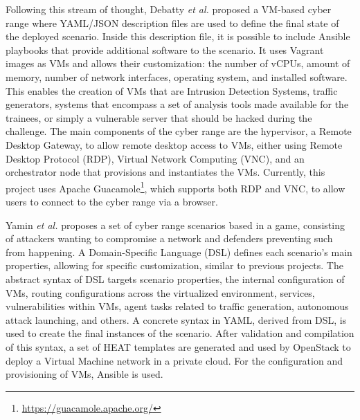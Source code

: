 Following this stream of thought, Debatty \textit{et al.} \cite{building_cr_ref} proposed a VM-based cyber range where YAML/JSON description files are used to define the final state of the deployed scenario. Inside this description file, it is possible to include Ansible playbooks that provide additional software to the scenario. It uses Vagrant images as VMs and allows their customization: the number of vCPUs, amount of memory, number of network interfaces, operating system, and installed software. This enables the creation of VMs that are Intrusion Detection Systems, traffic generators, systems that encompass a set of analysis tools made available for the trainees, or simply a vulnerable server that should be hacked during the challenge. The main components of the cyber range are the hypervisor, a Remote Desktop Gateway, to allow remote desktop access to VMs, either using Remote Desktop Protocol (RDP), Virtual Network Computing (VNC), and an orchestrator node that provisions and instantiates the VMs. Currently, this project uses Apache Guacamole\footnote{\url{https://guacamole.apache.org/}}, which supports both RDP and VNC, to allow users to connect to the cyber range via a browser.

Yamin \textit{et al.} \cite{serious_games_as_a_tool_to_model_attack_and_defense_scenarios_ref} proposes a set of cyber range scenarios based in a game, consisting of attackers wanting to compromise a network and defenders preventing such from happening. A Domain-Specific Language (DSL) defines each scenario's main properties, allowing for specific customization, similar to previous projects. The abstract syntax of DSL targets scenario properties, the internal configuration of VMs, routing configurations across the virtualized environment, services, vulnerabilities within VMs, agent tasks related to traffic generation, autonomous attack launching, and others. A concrete syntax in YAML, derived from DSL, is used to create the final instances of the scenario. After validation and compilation of this syntax, a set of HEAT templates are generated and used by OpenStack to deploy a Virtual Machine network in a private cloud. For the configuration and provisioning of VMs, Ansible is used.


